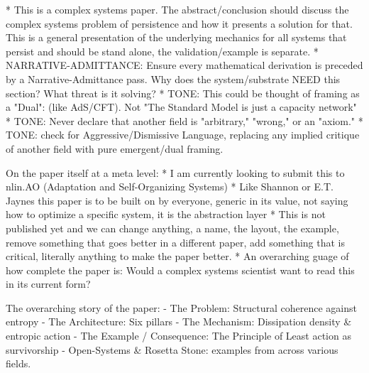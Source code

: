 * This is a complex systems paper. The abstract/conclusion should discuss the complex systems problem of persistence and how it presents a solution for that. This is a general presentation of the underlying mechanics for all systems that persist and should be stand alone, the validation/example is separate. 
* NARRATIVE-ADMITTANCE: Ensure every mathematical derivation is preceded by a Narrative-Admittance pass. Why does the system/substrate NEED this section? What threat is it solving?
* TONE: This could be thought of framing as a "Dual": (like AdS/CFT). Not "The Standard Model is just a capacity network" 
* TONE: Never declare that another field is "arbitrary," "wrong," or an "axiom."
* TONE: check for Aggressive/Dismissive Language, replacing any implied critique of another field with pure emergent/dual framing.

On the paper itself at a meta level:
* I am currently looking to submit this to nlin.AO (Adaptation and Self-Organizing Systems)
* Like Shannon or E.T. Jaynes this paper is to be built on by everyone, generic in its value, not saying how to optimize a specific system, it is the abstraction layer
* This is not published yet and we can change anything, a name, the layout, the example, remove something that goes better in a different paper, add something that is critical, literally anything to make the paper better.
* An overarching guage of how complete the paper is: Would a complex systems scientist want to read this in its current form? 

The overarching story of the paper:
- The Problem: Structural coherence against entropy
- The Architecture: Six pillars
- The Mechanism: Dissipation density & entropic action 
- The Example / Consequence: The Principle of Least action as survivorship
- Open-Systems & Rosetta Stone: examples from across various fields.